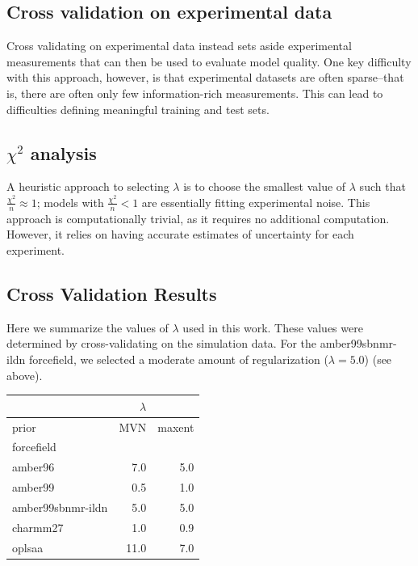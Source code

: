 \documentclass[journal=jacsat,manuscript=article]{achemso}
\begin{document}
\subsection{Cross validation on experimental data}

Cross validating on experimental data instead sets aside experimental measurements that can then be used to evaluate model quality.  One key difficulty with this approach, however, is that experimental datasets are often sparse--that is, there are often only few information-rich measurements.  This can lead to difficulties defining meaningful training and test sets.  

\subsection{$\chi^2$ analysis}

A heuristic approach to selecting $\lambda$ is to choose the smallest value of $\lambda$ such that $\frac{\chi^2}{n} \approx 1$; models with $\frac{\chi^2}{n} < 1$ are essentially fitting experimental noise.  This approach is computationally trivial, as it requires no additional computation.  However, it relies on having accurate estimates of uncertainty for each experiment.  

\subsection{Cross Validation Results}

Here we summarize the values of $\lambda$ used in this work.  These values were determined by cross-validating on the simulation data.  For the amber99sbnmr-ildn forcefield, we selected a moderate amount of regularization ($\lambda = 5.0$) (see above).  

\vspace{5mm}

\begin{tabular}{lrr}
\toprule
{}                &$\lambda$  &         \\
\midrule
prior &       MVN &  maxent \\
forcefield        &           &         \\
amber96           &      7.0  &    5.0  \\
amber99           &      0.5  &    1.0 \\
amber99sbnmr-ildn &      5.0  &    5.0 \\
charmm27          &      1.0  &    0.9 \\
oplsaa            &     11.0 &    7.0 \\
\bottomrule
\end{tabular}
\end{document}
